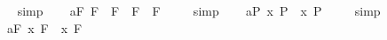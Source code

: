 \begin{isabellebody}
\isadelimproof
\ %
\endisadelimproof
%
\isatagproof
{}\isamarkupfalse%
\ simp\ \isamarkupfalse%
%
\endisatagproof
{\isafoldproof}%
%
\isadelimproof
%
\endisadelimproof
\isanewline
\ \isamarkupfalse%
\ a{}{}{\isacharunderscore}{}{\isacharunderscore}F{\isacharcolon}\ {\isachardoublequoteopen}{\isacharbrackleft}\isactrlbold {\isasymA}{\isacharparenleft}{\isasymphi}\isactrlsup F\ \isactrlbold {\isasymrightarrow}\ {\isasympsi}\isactrlsup F{\isacharparenright}\ \isactrlbold {\isasymequiv}\ {\isacharparenleft}\isactrlbold {\isasymA}{\isacharparenleft}{\isasymphi}\isactrlsup F{\isacharparenright}\ \isactrlbold {\isasymrightarrow}\ \isactrlbold {\isasymA}{\isacharparenleft}{\isasympsi}\isactrlsup F{\isacharparenright}{\isacharparenright}{\isacharbrackright}\ {\isacharequal}\ {\isasymtop}{\isachardoublequoteclose}%
\isadelimproof
\ %
\endisadelimproof
%
\isatagproof
{}\isamarkupfalse%
\ simp\ \isamarkupfalse%
%
\endisatagproof
{\isafoldproof}%
%
\isadelimproof
%
\endisadelimproof
\isanewline
\ \isamarkupfalse%
\ a{}{}{\isacharunderscore}{}{\isacharunderscore}P{\isacharcolon}\ {\isachardoublequoteopen}{\isacharbrackleft}\isactrlbold {\isasymA}{\isacharparenleft}\isactrlbold {\isasymforall}x{\isachardot}\ {\isasymphi}\isactrlsup P{\isacharparenright}\ \isactrlbold {\isasymequiv}\ {\isacharparenleft}\isactrlbold {\isasymforall}x{\isachardot}\ \isactrlbold {\isasymA}{\isacharparenleft}{\isasymphi}\isactrlsup P{\isacharparenright}{\isacharparenright}{\isacharbrackright}\ {\isacharequal}\ {\isasymtop}{\isachardoublequoteclose}%
\isadelimproof
\ %
\endisadelimproof
%
\isatagproof
{}\isamarkupfalse%
\ simp\ \isamarkupfalse%
%
\endisatagproof
{\isafoldproof}%
%
\isadelimproof
%
\endisadelimproof
\isanewline
\ \isamarkupfalse%
\ a{}{}{\isacharunderscore}{}{\isacharunderscore}F{\isacharcolon}\ {\isachardoublequoteopen}{\isacharbrackleft}{\isacharparenleft}\isactrlbold {\isasymA}{\isacharparenleft}\isactrlbold {\isasymforall}x{\isachardot}\ {\isasymphi}\isactrlsup F{\isacharparenright}\ \isactrlbold {\isasymequiv}\ {\isacharparenleft}\isactrlbold {\isasymforall}x{\isachardot}\ \isactrlbold {\isasymA}{\isacharparenleft}{\isasymphi}\isactrlsup F{\isacharparenright}{\isacharparenright}{\isacharparenright}{\isacharbrackright}\ {\isacharequal}\ {\isasymtop}{\isachardoublequoteclose}%
\isadelimproof
\ %
\endisadelimproof
%
\isatagproof

\end{isabellebody}
